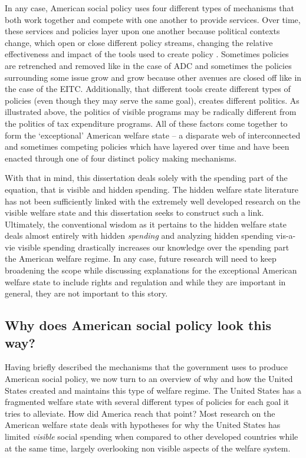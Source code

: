 \documentclass[12pt]{article}
\begin{document}
In any case, American social policy uses four different types of mechanisms that both work together and compete with one another to provide services. Over time, these services and policies layer upon one another because political contexts change, which open or close different policy streams, changing the relative effectiveness and impact of the tools used to create policy \citep{kingdon2011}. Sometimes policies are retrenched and removed like in the case of ADC and sometimes the policies surrounding some issue grow and grow because other avenues are closed off like in the case of the EITC. Additionally, that different tools create different types of policies (even though they may serve the same goal), creates different politics. As illustrated above, the politics of visible programs may be radically different from the politics of tax expenditure programs. All of these factors come together to form the `exceptional' American welfare state -- a disparate web of interconnected and sometimes competing policies which have layered over time and have been enacted through one of four distinct policy making mechanisms.

With that in mind, this dissertation deals solely with the spending part of the equation, that is visible and hidden spending. The hidden welfare state literature has not been sufficiently linked with the extremely well developed research on the visible welfare state and this dissertation seeks to construct such a link. Ultimately, the conventional wisdom as it pertains to the hidden welfare state deals almost entirely with hidden \emph{spending} and analyzing hidden spending vis-a-vie visible spending drastically increases our knowledge over the spending part the American welfare regime. In any case, future research will need to keep broadening the scope while discussing explanations for the exceptional American welfare state to include rights and regulation and while they are important in general, they are not important to this story.

\subsection{Why does American social policy look this way?}
Having briefly described the mechanisms that the government uses to produce American social policy, we now turn to an overview of why and how the United States created and maintains this type of welfare regime. The United States has a fragmented welfare state with several different types of policies for each goal it tries to alleviate. How did America reach that point? Most research on the American welfare state deals with hypotheses for why the United States has limited \emph{visible} social spending when compared to other developed countries while at the same time, largely overlooking non visible aspects of the welfare system. 
\end{document}
